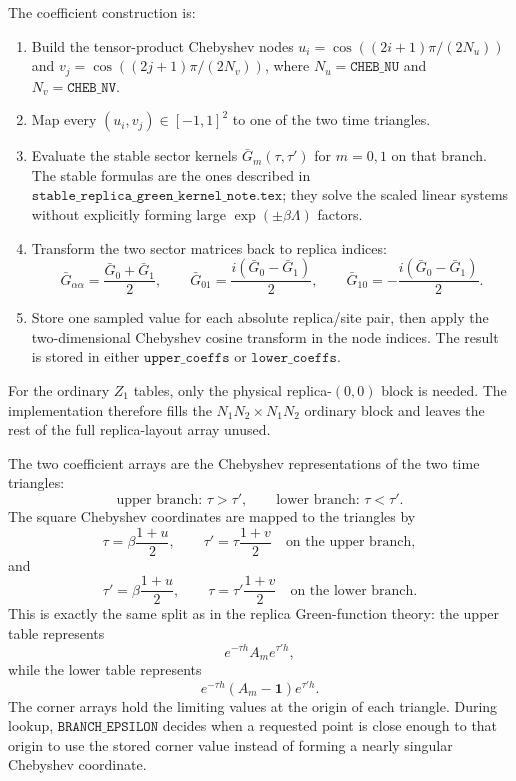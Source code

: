 \documentclass[11pt]{article}
\newcommand{\1}{\mathbf{1}}
\begin{document}
The coefficient construction is:
\begin{enumerate}[leftmargin=2em]
  \item Build the tensor-product Chebyshev nodes
  \(u_i=\cos((2i+1)\pi/(2N_u))\) and
  \(v_j=\cos((2j+1)\pi/(2N_v))\), where
  \(N_u=\texttt{CHEB\_NU}\) and \(N_v=\texttt{CHEB\_NV}\).
  \item Map every \((u_i,v_j)\in[-1,1]^2\) to one of the two time triangles.
  \item Evaluate the stable sector kernels
  \(\bar G_m(\tau,\tau')\) for \(m=0,1\) on that branch.  The stable formulas
  are the ones described in
  \(\texttt{stable\_replica\_green\_kernel\_note.tex}\); they solve the scaled
  linear systems without explicitly forming large
  \(\exp(\pm\beta\Lambda)\) factors.
  \item Transform the two sector matrices back to replica indices:
  \[
    \bar G_{\alpha\alpha}
      =\frac{\bar G_0+\bar G_1}{2},\qquad
    \bar G_{01}
      =\frac{i(\bar G_0-\bar G_1)}{2},\qquad
    \bar G_{10}
      =-\frac{i(\bar G_0-\bar G_1)}{2}.
  \]
  \item Store one sampled value for each absolute replica/site pair, then apply
  the two-dimensional Chebyshev cosine transform in the node indices.  The
  result is stored in either \(\texttt{upper\_coeffs}\) or
  \(\texttt{lower\_coeffs}\).
\end{enumerate}
For the ordinary \(Z_1\) tables, only the physical replica-\((0,0)\) block is
needed.  The implementation therefore fills the \(N_1N_2\times N_1N_2\)
ordinary block and leaves the rest of the full replica-layout array unused.

The two coefficient arrays are the Chebyshev representations of the two time
triangles:
\[
  \text{upper branch: }\tau>\tau',
  \qquad
  \text{lower branch: }\tau<\tau'.
\]
The square Chebyshev coordinates are mapped to the triangles by
\[
  \tau=\beta\frac{1+u}{2},\qquad
  \tau'=\tau\frac{1+v}{2}
  \quad\text{on the upper branch},
\]
and
\[
  \tau'=\beta\frac{1+u}{2},\qquad
  \tau=\tau'\frac{1+v}{2}
  \quad\text{on the lower branch}.
\]
This is exactly the same split as in the replica Green-function theory:
the upper table represents
\[
  e^{-\tau h}A_m e^{\tau' h},
\]
while the lower table represents
\[
  e^{-\tau h}(A_m-\mathbf 1)e^{\tau' h}.
\]
The corner arrays hold the limiting values at the origin of each triangle.
During lookup, \(\texttt{BRANCH\_EPSILON}\) decides when a requested point is
close enough to that origin to use the stored corner value instead of forming a
nearly singular Chebyshev coordinate.
\end{document}
